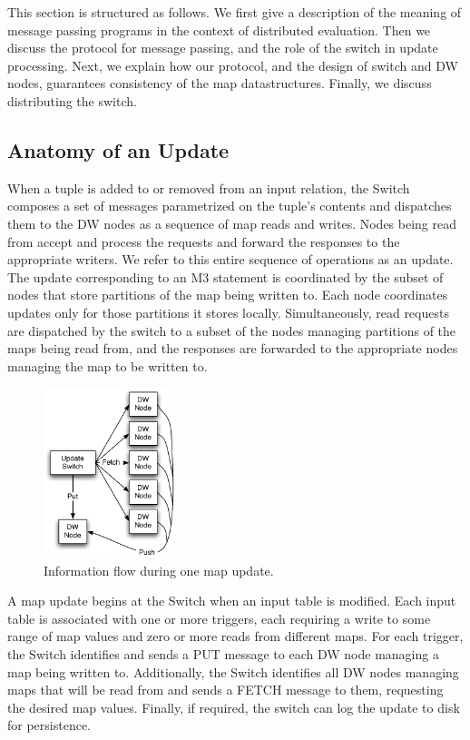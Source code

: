 This section is structured as follows. We first give a description of
the meaning of message passing programs in the context of distributed
evaluation. Then we discuss the protocol for message passing, and the role
of the switch in update processing. Next, we explain how our protocol, and
the design of switch and DW nodes, guarantees consistency of the
map datastructures. Finally, we discuss distributing the switch.


\subsection{Anatomy of an Update}


When a tuple is added to or removed from an input relation, the Switch
composes a set of messages parametrized on the tuple's contents and
dispatches them to the DW nodes as a sequence of map reads and writes.
Nodes being read from accept and process the requests and forward the
responses to the appropriate writers.  We refer to this entire sequence
of operations as an update.
The update corresponding to an M3 statement is coordinated by the subset of
nodes that store partitions of the map being written to.  Each node
coordinates updates only for those partitions it stores locally.
Simultaneously, read requests are dispatched by the switch to a subset
of the nodes managing partitions of the maps being read from, and the
responses are forwarded to the appropriate nodes managing the map to be
written to.  


\begin{figure}
\begin{center}
\includegraphics[width=1.5in]{images/UpdateStep.pdf}
\caption{Information flow during one map update.}
\label{fig:updatestep}
\end{center}
\end{figure}


A map update begins at the Switch when an input table is modified.  Each input table is associated with one or more triggers, each requiring a write to some range of map values and zero or more reads from different maps.  For each trigger, the Switch identifies and sends a PUT message to each DW node managing a map being written to.  Additionally, the Switch identifies all DW nodes managing maps that will be read from and sends a FETCH message to them, requesting the desired map values.  Finally, if required,
%
%
the switch can log the update to disk for persistence.

